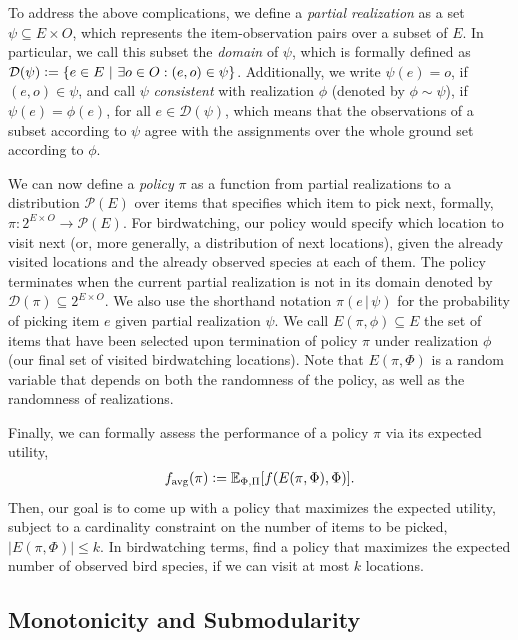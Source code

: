 \documentclass{article}
\newcommand{\defeq}{\vcentcolon=}
\let\originalleft\left
\let\originalright\right
\renewcommand{\left}{\mathopen{}\mathclose\bgroup\originalleft}
\renewcommand{\right}{\aftergroup\egroup\originalright}
\newcommand{\smid}{\ \middle\vert\ }
\newcommand{\mmid}{\,\vert\,}
\newcommand{\sdef}[2]{\left\{#1\smid#2\right\}}
\newcommand{\favg}{f_{\mathrm{avg}}}
\newcommand{\dom}{\mathcal{D}}
\begin{document}
To address the above complications, we define a \emph{partial realization} as a set $ \psi \subseteq E \times O$, which represents the item-observation pairs over a subset of $E$.
In particular, we call this subset the \emph{domain} of $\psi$, which is formally defined as $\dom(\psi) \defeq \sdef{e \in E}{\exists o \in O : (e, o) \in \psi}$.
Additionally, we write $\psi(e) = o$, if $(e, o) \in \psi$, and call $\psi$ \emph{consistent} with realization $\phi$ (denoted by $\phi \sim \psi$), if $\psi(e) = \phi(e)$, for all $e \in \dom(\psi)$, which means that the observations of a subset according to $\psi$ agree with the assignments over the whole ground set according to $\phi$.

We can now define a \emph{policy} $\pi$ as a function from partial realizations to a distribution $\mathcal{P}(E)$ over items that specifies which item to pick next, formally, $\pi : 2^{E \times O} \to \mathcal{P}(E)$. 
For birdwatching, our policy would specify which location to visit next (or, more generally, a distribution of next locations), given the already visited locations and the already observed species at each of them.
The policy terminates when the current partial realization is not in its domain denoted by $\dom(\pi) \subseteq 2^{E \times O}$.
We also use the shorthand notation $\pi(e\mmid\psi)$ for the probability of picking item $e$ given partial realization $\psi$.
We call $E(\pi, \phi) \subseteq E$ the set of items that have been selected upon termination of policy $\pi$ under realization $\phi$ (our final set of visited birdwatching locations).
Note that $E(\pi, \Phi)$ is a random variable that depends on both the randomness of the policy, as well as the randomness of realizations.

Finally, we can formally assess the performance of a policy $\pi$ via its expected utility,
\begin{align*}
  \favg(\pi) \defeq \E[\Phi,\Pi]{f(E(\pi, \Phi), \Phi)}.
\end{align*}
Then, our goal is to come up with a policy that maximizes the expected utility, subject to a cardinality constraint on the number of items to be picked, $|E(\pi, \Phi)| \leq k$.
In birdwatching terms, find a policy that maximizes the expected number of observed bird species, if we can visit at most $k$ locations.

\subsection{Monotonicity and Submodularity}
\end{document}
